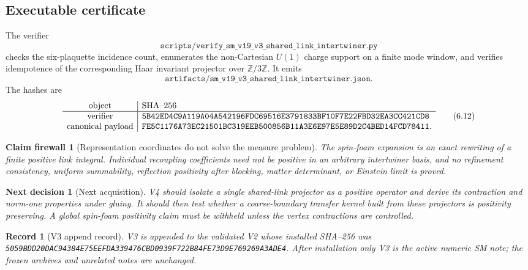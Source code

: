 \documentclass[11pt]{article}
\newtheorem{firewall}[theorem]{Claim firewall}
\newtheorem{decision}[theorem]{Next decision}
\newtheorem{record}[theorem]{Record}
\theoremstyle{remark}
\begin{document}
\subsection{Executable certificate}

The verifier
\[
 \texttt{scripts/verify\_sm\_v19\_v3\_shared\_link\_intertwiner.py} \tag{6.10}
\]
checks the six-plaquette incidence count, enumerates the non-Cartesian
\(U(1)\) charge support on a finite mode window, and verifies idempotence of
the corresponding Haar invariant projector over
\(\mathbb Z/3\mathbb Z\).  It emits
\[
 \texttt{artifacts/sm\_v19\_v3\_shared\_link\_intertwiner.json}.    \tag{6.11}
\]
The hashes are
\[
\begin{array}{c|l}
\hbox{object}&\hbox{SHA--256}\\ \hline
\hbox{verifier}&
\texttt{5B42ED4C9A119A04A542196FDC69516E3791833BF10F7E22FBD32EA3CC421CD8}\\
\hbox{canonical payload}&
\texttt{FE5C1176A73EC21501BC319EEB500856B11A3E6E97E5E89D2C4BED14FCD78411}.
\end{array}                                                   \tag{6.12}
\]

\begin{firewall}[Representation coordinates do not solve the measure problem]
\label{fire:v19v3}
The spin-foam expansion is an exact rewriting of a finite positive link
integral.  Individual recoupling coefficients need not be positive in an
arbitrary intertwiner basis, and no refinement consistency, uniform
summability, reflection positivity after blocking, matter determinant, or
Einstein limit is proved.
\end{firewall}

\begin{decision}[Next acquisition]
\label{dec:v19v3-next}
V4 should isolate a single shared-link projector as a positive operator and
derive its contraction and norm-one properties under gluing.  It should
then test whether a coarse-boundary transfer kernel built from these
projectors is positivity preserving.  A global spin-foam positivity claim
must be withheld unless the vertex contractions are controlled.
\end{decision}

\begin{record}[V3 append record]
\label{rec:v19v3}
V3 is appended to the validated V2 whose installed SHA--256 was
\texttt{5059BDD20DAC94384E75EEFDA339476CBD0939F722B84FE73D9E769269A3ADE4}.
After installation only V3 is the active numeric SM note; the frozen
archives and unrelated notes are unchanged.
\end{record}
\end{document}
